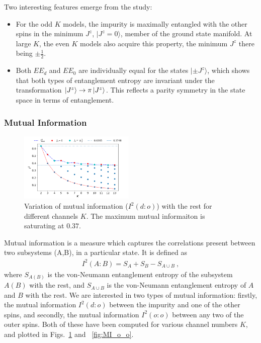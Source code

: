 \documentclass[reprint,prb,superscriptaddress]{revtex4-2}
\begin{document}
Two interesting features emerge from the study:
\begin{itemize}
	\item For the odd \(K\) models, the impurity is maximally entangled with the other spins in the minimum \(J^z\), $|J^z=0\rangle$, member of the ground state manifold.
	At large \(K\), the even \(K\) models also acquire this property, the minimum \(J^z\) there being \(\pm \frac{1}{2}\).
	\item 
	Both \(EE_d\) and \(EE_0\) are individually equal for the states $|\pm J^z\rangle$, which shows that both types of entanglement entropy are invariant under the transformation \(\ket{J^z} \to \pi \ket{J^z}\). This reflects a parity symmetry in the state space in terms of entanglement.
\end{itemize}

\subsubsection{Mutual Information}

\begin{figure}[!htpb]
\includegraphics[width=0.49\textwidth]{plt/NEW31Dec_I_2_vs_Nch_[0,1]}
\caption{Variation of mutual information ($I^2(d:o)$) with the rest for different channels $K$. The maximum mutual informaiton is saturating at $0.37$.}
\label{fig:MI_d_o}
\end{figure}

Mutual information is a measure which captures the correlations present between two subsystems (A,B), in a particular state. It is defined as
\begin{eqnarray}
I^2(A:B)=S_A+S_B-S_{A\cup B}~,
\end{eqnarray}
where $S_{A(B)}$ is the von-Neumann entanglement entropy of the subsystem $A(B)$ with the rest, and \(S_{A\cup B}\) is the von-Neumann entanglement entropy of \(A\) and \(B\) with the rest.
We are interested in two types of mutual information: firstly, the mutual information $I^2(d:o)$ between the impurity and one of the other spins, and secondly, the mutual information $I^2(o:o)$ between any two of the outer spins.
Both of these have been computed for various channel numbers \(K\), and plotted in Figs.~\ref{fig:MI_d_o} and ~\ref{fig:MI_o_o}.
\end{document}
